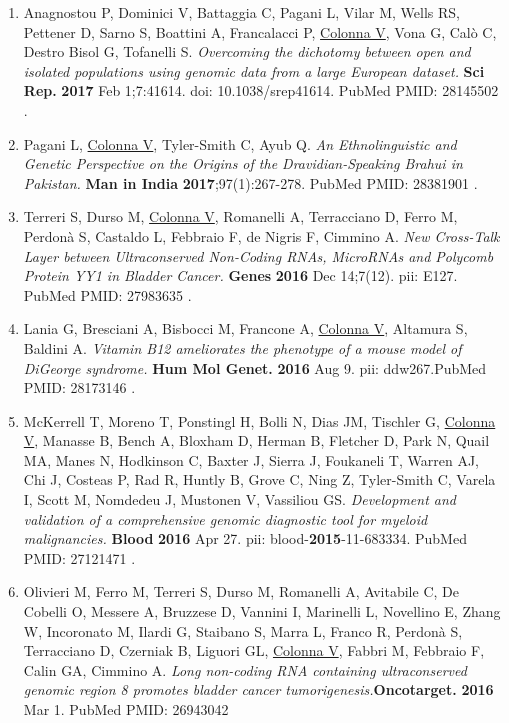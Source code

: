 \documentclass[openany]{book}
\begin{document}
\begin{enumerate}
    \item Anagnostou P, Dominici V, Battaggia C, Pagani L, Vilar M, Wells RS, Pettener D, Sarno S, Boattini A, Francalacci P, \underline{Colonna V}, Vona G, Calò C, Destro Bisol G, Tofanelli S. \textit{Overcoming the dichotomy between open and isolated populations using genomic data from a large European dataset.} \textbf{Sci Rep.} \textbf{2017} Feb 1;7:41614. doi: 10.1038/srep41614. PubMed PMID: 28145502 .

    \item Pagani L, \underline{Colonna V}, Tyler-Smith C, Ayub Q. \textit{An Ethnolinguistic and Genetic Perspective on the Origins of the Dravidian-Speaking Brahui in Pakistan.} \textbf{Man in India} \textbf{2017};97(1):267-278. PubMed PMID: 28381901 .


    \item Terreri S, Durso M, \underline{Colonna V}, Romanelli A, Terracciano D, Ferro M, Perdonà S, Castaldo L, Febbraio F, de Nigris F, Cimmino A. \textit{New Cross-Talk Layer between Ultraconserved Non-Coding RNAs, MicroRNAs and Polycomb Protein YY1 in Bladder Cancer.} \textbf{Genes} \textbf{2016} Dec 14;7(12). pii: E127. PubMed PMID: 27983635 .

    \item Lania G, Bresciani A, Bisbocci M, Francone A, \underline{Colonna V}, Altamura S, Baldini A. \textit{Vitamin B12 ameliorates the phenotype of a mouse model of DiGeorge syndrome.} \textbf{Hum Mol Genet.} \textbf{2016} Aug 9. pii: ddw267.PubMed PMID: 28173146 .

    \item McKerrell T, Moreno T, Ponstingl H, Bolli N, Dias JM, Tischler G, \underline{Colonna V}, Manasse B, Bench A, Bloxham D, Herman B, Fletcher D, Park N, Quail MA, Manes N, Hodkinson C, Baxter J, Sierra J, Foukaneli T, Warren AJ, Chi J, Costeas P, Rad R, Huntly B, Grove C, Ning Z, Tyler-Smith C, Varela I, Scott M, Nomdedeu J, Mustonen V, Vassiliou GS. \textit{Development and validation of a comprehensive genomic diagnostic tool for myeloid malignancies.} \textbf{Blood }\textbf{2016} Apr 27. pii: blood-\textbf{2015}-11-683334. PubMed PMID: 27121471 .


    \item Olivieri M, Ferro M, Terreri S, Durso M, Romanelli A, Avitabile C, De Cobelli O, Messere A, Bruzzese D, Vannini I, Marinelli L, Novellino E, Zhang W, Incoronato M, Ilardi G, Staibano S, Marra L, Franco R, Perdonà S, Terracciano D, Czerniak B, Liguori GL, \underline{Colonna V}, Fabbri M, Febbraio F, Calin GA, Cimmino A. \textit{Long non-coding RNA containing ultraconserved genomic region 8 promotes bladder cancer tumorigenesis.}\textbf{Oncotarget. }\textbf{2016} Mar 1. PubMed PMID: 26943042


\end{enumerate}
\end{document}
